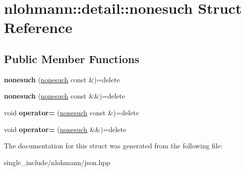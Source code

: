 \hypertarget{structnlohmann_1_1detail_1_1nonesuch}{}\section{nlohmann\+:\+:detail\+:\+:nonesuch Struct Reference}
\label{structnlohmann_1_1detail_1_1nonesuch}
\subsection*{Public Member Functions}
\begin{DoxyCompactItemize}
\item 
\mbox{\label{structnlohmann_1_1detail_1_1nonesuch_a563462ef2d05fe60cdf1dc7f567dc276}} 
{\bfseries nonesuch} (\hyperlink{structnlohmann_1_1detail_1_1nonesuch}{nonesuch} const \&)=delete
\item 
\mbox{\label{structnlohmann_1_1detail_1_1nonesuch_ad7719f7d2a00263be8b8d123870217d8}} 
{\bfseries nonesuch} (\hyperlink{structnlohmann_1_1detail_1_1nonesuch}{nonesuch} const \&\&)=delete
\item 
\mbox{\label{structnlohmann_1_1detail_1_1nonesuch_add6ef84c52a851e391cef514c85f2ffe}} 
void {\bfseries operator=} (\hyperlink{structnlohmann_1_1detail_1_1nonesuch}{nonesuch} const \&)=delete
\item 
\mbox{\label{structnlohmann_1_1detail_1_1nonesuch_a78ca022a1b4defe4f7ba662843602231}} 
void {\bfseries operator=} (\hyperlink{structnlohmann_1_1detail_1_1nonesuch}{nonesuch} \&\&)=delete
\end{DoxyCompactItemize}


The documentation for this struct was generated from the following file\+:\begin{DoxyCompactItemize}
\item 
single\+\_\+include/nlohmann/json.\+hpp\end{DoxyCompactItemize}
